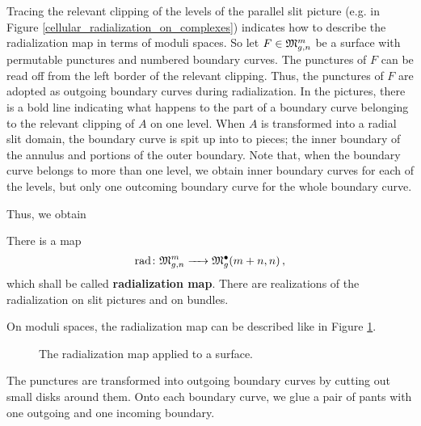 Tracing the relevant clipping of the levels of the parallel slit picture (e.g. in Figure \ref{cellular_radialization_on_complexes}) indicates how to describe the radialization map in terms of moduli spaces.
So let $F \in \Modspc$ be a surface with permutable punctures and numbered boundary curves.
The punctures of $F$ can be read off from the left border of the relevant clipping.
Thus, the punctures of $F$ are adopted as outgoing boundary curves during radialization.
In the pictures, there is a bold line indicating what happens to the part of a boundary curve belonging to the relevant clipping of $A$ on one level.
When $A$ is transformed into a radial slit domain, the boundary curve is spit up into to pieces; 
the inner boundary of the annulus and portions of the outer boundary.
Note that, when the boundary curve belongs to more than one level, we obtain inner boundary curves for each of the levels, but only one outcoming boundary curve for the whole boundary curve. 

Thus, we obtain 

\begin{defi}
 There is a map
 \[
    \radmap \colon \Modspc \to \ModspcRadm[m+n]\,,
 \]
 which shall be called \textbf{radialization map}.
 There are realizations of the radialization on slit pictures and on bundles.
\end{defi}

On moduli spaces, the radialization map can be described like in Figure \ref{cellular_radialization_on_modspc}.
\begin{figure}[ht]
\centering
\def\svgwidth{0.95\columnwidth}

\caption{\label{cellular_radialization_on_modspc} The radialization map applied to a surface.}
\end{figure}
The punctures are transformed into outgoing boundary curves by cutting out small disks around them.
Onto each boundary curve, we glue a pair of pants with one outgoing and one incoming boundary.

